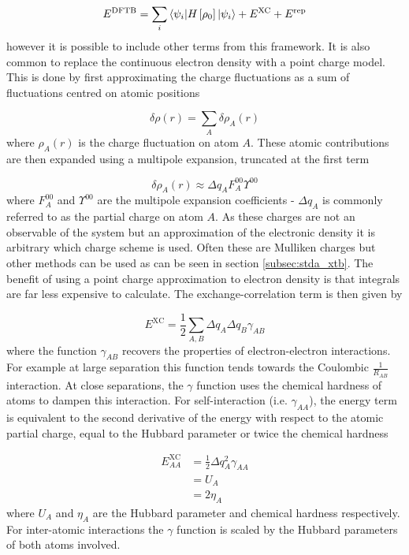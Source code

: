 \begin{equation}
    \label{eq:dftb_energies}
    E^{\text{DFTB}} = \sum_i \braket{\psi_i|H_{} \left[ \rho_0 \right]|\psi_i} + E^\text{XC} + E^\text{rep}
\end{equation}
%
however it is possible to include other terms from this framework. It is also common
to replace the continuous electron density with a point charge model. This is done
by first approximating the charge fluctuations as a sum of fluctuations centred 
on atomic positions

\begin{equation}
    \delta \rho\left(r\right) = \sum_A \delta \rho_A \left(r\right)
\end{equation}
%
where $\rho_A \left(r\right)$ is the charge fluctuation on atom $A$. These atomic
contributions are then expanded using a multipole expansion, truncated at the first
term

\begin{equation}
    \delta \rho_A \left(r\right) \approx \Delta q_A F_A^{00} \Upsilon^{00}
\end{equation}
%
where $F_A^{00}$ and $\Upsilon^{00}$ are the multipole expansion coefficients - 
$\Delta q_A$ is commonly referred to as the partial charge on atom $A$. As these
charges are not an observable of the system but an approximation of the electronic
density it is arbitrary which charge scheme is used. Often these are Mulliken charges 
but other methods can be used as can be seen in section \ref{subsec:stda_xtb}. The
benefit of using a point charge approximation to electron density is that integrals
are far less expensive to calculate. The exchange-correlation term is then given
by

\begin{equation}
    E^{\text{XC}} = \frac{1}{2}\sum_{A,B} \Delta q_A \Delta q_B \gamma_{AB}
\end{equation}
%
where the function $\gamma_{AB}$ recovers the properties of electron-electron interactions.
For example at large separation this function tends towards the Coulombic $\frac{1}{R_{AB}}$
interaction. At close separations, the $\gamma$ function uses the chemical hardness 
of atoms to dampen this interaction. For self-interaction (i.e. $\gamma_{AA}$), 
the energy term is equivalent to the second derivative of the energy with respect
to the atomic partial charge, equal to the Hubbard parameter or twice the chemical
hardness 

\begin{equation}
    \begin{split}
    E^{\text{XC}}_{AA} &= \frac{1}{2} \Delta q_A^2 \gamma_{AA} \\
    &= U_{A} \\
    &= 2 \eta_A
    \end{split}
\end{equation}
%
where $U_A$ and $\eta_A$ are the Hubbard parameter and chemical hardness respectively.
For inter-atomic interactions the $\gamma$ function is scaled by the Hubbard parameters
of both atoms involved.

